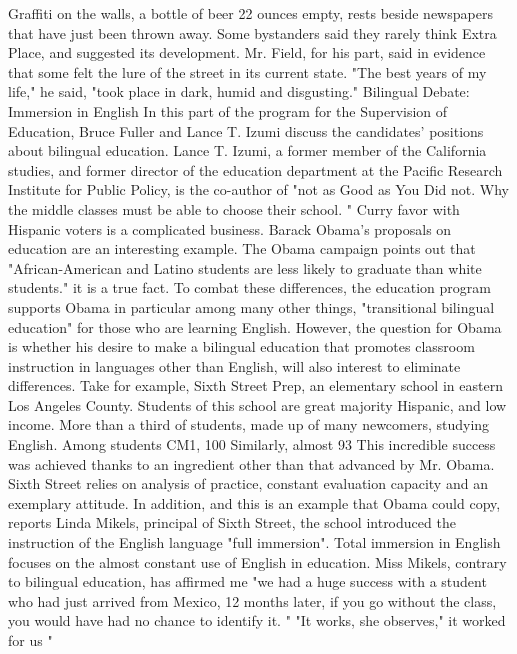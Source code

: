 Graffiti on the walls, a bottle of beer 22 ounces empty, rests beside newspapers that have just been thrown away.
Some bystanders said they rarely think Extra Place, and suggested its development.
Mr. Field, for his part, said in evidence that some felt the lure of the street in its current state.
"The best years of my life," he said, "took place in dark, humid and disgusting."
Bilingual Debate: Immersion in English
In this part of the program for the Supervision of Education, Bruce Fuller and Lance T. Izumi discuss the candidates' positions about bilingual education.
Lance T. Izumi, a former member of the California studies, and former director of the education department at the Pacific Research Institute for Public Policy, is the co-author of "not as Good as You Did not. Why the middle classes must be able to choose their school. "
Curry favor with Hispanic voters is a complicated business.
Barack Obama's proposals on education are an interesting example.
The Obama campaign points out that "African-American and Latino students are less likely to graduate than white students." it is a true fact.
To combat these differences, the education program supports Obama in particular among many other things, "transitional bilingual education" for those who are learning English.
However, the question for Obama is whether his desire to make a bilingual education that promotes classroom instruction in languages ​​other than English, will also interest to eliminate differences.
Take for example, Sixth Street Prep, an elementary school in eastern Los Angeles County.
Students of this school are great majority Hispanic, and low income.
More than a third of students, made up of many newcomers, studying English.
Among students CM1, 100%
Similarly, almost 93%
This incredible success was achieved thanks to an ingredient other than that advanced by Mr. Obama.
Sixth Street relies on analysis of practice, constant evaluation capacity and an exemplary attitude.
In addition, and this is an example that Obama could copy, reports Linda Mikels, principal of Sixth Street, the school introduced the instruction of the English language "full immersion".
Total immersion in English focuses on the almost constant use of English in education.
Miss Mikels, contrary to bilingual education, has affirmed me "we had a huge success with a student who had just arrived from Mexico, 12 months later, if you go without the class, you would have had no chance to identify it. "
"It works, she observes," it worked for us "

